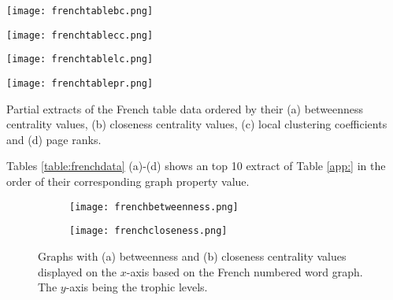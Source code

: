 \begin{table}[H]
\centering
\begin{subtable}{.27\textwidth}
	\texttt{[image: frenchtablebc.png]}
	\caption{}
	\label{table:frenchtablebc}
\end{subtable}
\hfill
\begin{subtable}{.2\textwidth}
	\centering
	\texttt{[image: frenchtablecc.png]}
	\caption{}
	\label{table:frenchtablecc}
\end{subtable}
\hfill
\begin{subtable}{.2\textwidth}
	\centering
	\texttt{[image: frenchtablelc.png]}
	\caption{}
	\label{table:frenchtablelc}
\end{subtable}
\hfill
\begin{subtable}{.2\textwidth}
	\centering
	\texttt{[image: frenchtablepr.png]}
	\caption{}
	\label{table:frenchtablepr}
\end{subtable}
\caption{Partial extracts of the French table data ordered by their (a) betweenness centrality values, (b) closeness centrality values, (c) local clustering coefficients and (d) page ranks.}
\label{table:frenchdata}
\end{table}

Tables \ref{table:frenchdata} (a)-(d) shows an top 10 extract of Table \ref{app:} in the order of their corresponding graph property value.

\begin{figure}[H]
\centering
\begin{subfigure}{.45\textwidth}
	\hspace{-1cm} 
	\texttt{[image: frenchbetweenness.png]}
	\caption{}
	\label{fig:frbc}
\end{subfigure}
\hfill
\begin{subfigure}{.45\textwidth}
	\hspace{-1cm} 
	\texttt{[image: frenchcloseness.png]}
	\caption{ }
	\label{fig:frcc}
\end{subfigure}
\caption{Graphs with (a) betweenness and (b) closeness centrality values displayed on the $x$-axis based on the French numbered word graph. The $y$-axis being the trophic levels.}
\label{fig:frcentrality}
\end{figure}

